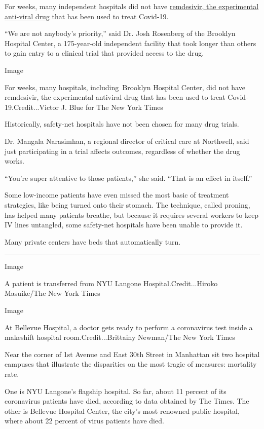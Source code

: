 For weeks, many independent hospitals did not have
\href{https://www.nytimes.com/2020/04/29/health/gilead-remdesivir-coronavirus.html}{remdesivir,
the experimental anti-viral drug} that has been used to treat Covid-19.

``We are not anybody's priority,'' said Dr. Josh Rosenberg of the
Brooklyn Hospital Center, a 175-year-old independent facility that took
longer than others to gain entry to a clinical trial that provided
access to the drug.

Image

For weeks, many hospitals, including~Brooklyn Hospital Center, did not
have remdesivir, the experimental antiviral drug that has been used to
treat Covid-19.Credit...Victor J. Blue for The New York Times

Historically, safety-net hospitals have not been chosen for many drug
trials.

Dr. Mangala Narasimhan, a regional director of critical care at
Northwell, said just participating in a trial affects outcomes,
regardless of whether the drug works.

``You're super attentive to those patients,'' she said. ``That is an
effect in itself.''

Some low-income patients have even missed the most basic of treatment
strategies, like being turned onto their stomach. The technique, called
proning, has helped many patients breathe, but because it requires
several workers to keep IV lines untangled, some safety-net hospitals
have been unable to provide it.

Many private centers have beds that automatically turn.

\begin{center}\rule{0.5\linewidth}{\linethickness}\end{center}

Image

A patient is transferred from NYU Langone Hospital.Credit...Hiroko
Masuike/The New York Times

Image

At Bellevue Hospital, a doctor gets ready to perform a coronavirus test
inside a makeshift hospital room.Credit...Brittainy Newman/The New York
Times

Near the corner of 1st Avenue and East 30th Street in Manhattan sit two
hospital campuses that illustrate the disparities on the most tragic of
measures: mortality rate.

One is NYU Langone's flagship hospital. So far, about 11 percent of its
coronavirus patients have died, according to data obtained by The Times.
The other is Bellevue Hospital Center, the city's most renowned public
hospital, where about 22 percent of virus patients have died.

